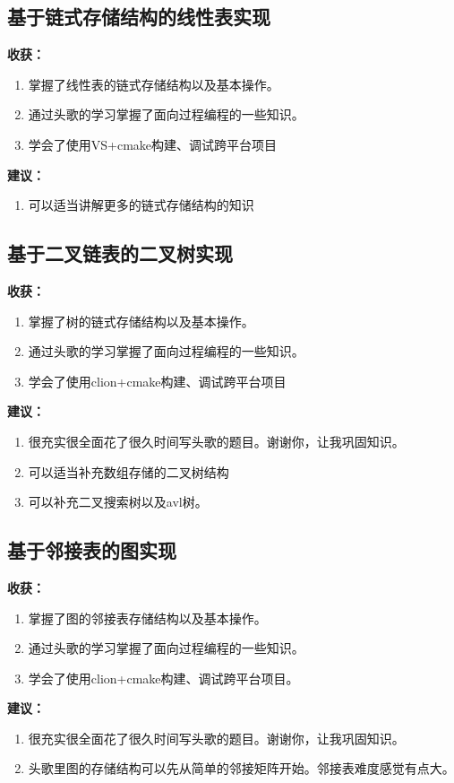 \documentclass[supercite]{Experimental_Report}
\theoremstyle{definition}
\begin{document}
\subsection{基于链式存储结构的线性表实现}
\noindent\textbf{收获：}
	\begin{enumerate}
		\item 掌握了线性表的链式存储结构以及基本操作。
		\item 通过头歌的学习掌握了面向过程编程的一些知识。
		\item 学会了使用VS+cmake构建、调试跨平台项目
	\end{enumerate}
	\noindent\textbf{建议：}
	\begin{enumerate}
		\item 可以适当讲解更多的链式存储结构的知识
	\end{enumerate}

\subsection{基于二叉链表的二叉树实现}
	\noindent\textbf{收获：}
	\begin{enumerate}
		\item 掌握了树的链式存储结构以及基本操作。
		\item 通过头歌的学习掌握了面向过程编程的一些知识。
		\item 学会了使用clion+cmake构建、调试跨平台项目
	\end{enumerate}
	\noindent\textbf{建议：}
	\begin{enumerate}
		\item 很充实很全面花了很久时间写头歌的题目。谢谢你，让我巩固知识。
		\item 可以适当补充数组存储的二叉树结构
		\item 可以补充二叉搜索树以及avl树。
	\end{enumerate}

\subsection{基于邻接表的图实现}
	\noindent\textbf{收获：}
	\begin{enumerate}
		\item 掌握了图的邻接表存储结构以及基本操作。
		\item 通过头歌的学习掌握了面向过程编程的一些知识。
		\item 学会了使用clion+cmake构建、调试跨平台项目。
	\end{enumerate}
	\noindent\textbf{建议：}
	\begin{enumerate}
		\item 很充实很全面花了很久时间写头歌的题目。谢谢你，让我巩固知识。
		\item 头歌里图的存储结构可以先从简单的邻接矩阵开始。邻接表难度感觉有点大。
	\end{enumerate}


\nocite{*} %



\setcounter{secnumdepth}{0}
\appendix

	
\newpage
	
\newpage
	
\newpage
	
\end{document}
